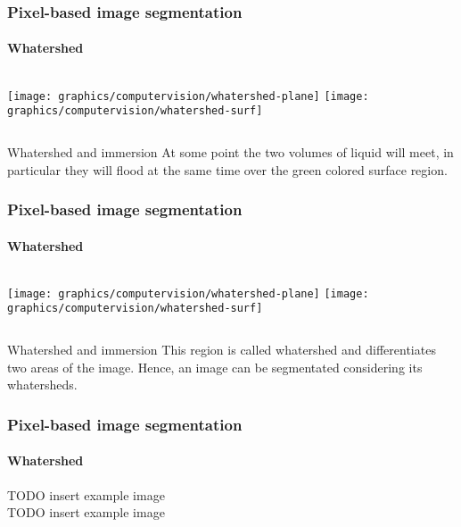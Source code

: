     \begin{frame}
        \frametitle{Pixel-based image segmentation}
        \framesubtitle{Whatershed}
        \begin{columns}[onlytextwidth]
            \texttt{[image: graphics/computervision/whatershed-plane]}
            \texttt{[image: graphics/computervision/whatershed-surf]}
        \end{columns}
        \begin{block}{Whatershed and immersion}
            At some point the two volumes of liquid will meet, in particular they will flood at the same time over the green colored surface region.
        \end{block}
    \end{frame}

    \begin{frame}
        \frametitle{Pixel-based image segmentation}
        \framesubtitle{Whatershed}
        \begin{columns}[onlytextwidth]
            \texttt{[image: graphics/computervision/whatershed-plane]}
            \texttt{[image: graphics/computervision/whatershed-surf]}
        \end{columns}
        \begin{block}{Whatershed and immersion}
            This region is called whatershed and differentiates two areas of the image. Hence, an image can be segmentated considering its whatersheds.
        \end{block}
    \end{frame}

    \begin{frame}
        \frametitle{Pixel-based image segmentation}
        \framesubtitle{Whatershed}
        TODO insert example image\\
        TODO insert example image
    \end{frame}


